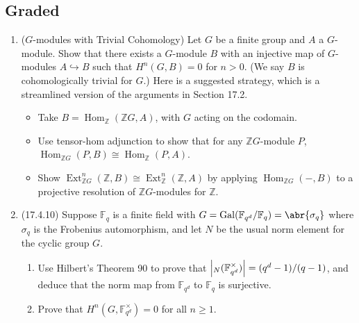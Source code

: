 \documentclass[11pt]{article}
\DeclareMathOperator{\Gal}{Gal}
\DeclareMathOperator{\Hom}{Hom}
\DeclareMathOperator{\Ext}{Ext}
\begin{document}
\subsection*{Graded}
\begin{enumerate}
    \item ($G$-modules with Trivial Cohomology) Let $G$ be a finite group and $A$ a $G$-module. Show that there exists a $G$-module $B$ with an injective map of $G$-modules $A\hookrightarrow B$ such that $H^n(G,B) = 0$ for $n>0$. (We say $B$ is cohomologically trivial for $G$.) Here is a suggested strategy, which is a streamlined version of the arguments in Section 17.2. \begin{itemize}
        \item Take $B = \Hom_{\mathbb{Z}}(\mathbb{Z}G, A)$, with $G$ acting on the codomain.
        \item Use tensor-hom adjunction to show that for any $\mathbb{Z}G$-module $P$, $\Hom_{\mathbb{Z}G}(P,B)\cong \Hom_\mathbb{Z}(P,A)$.
        \item Show $\Ext_{\mathbb{Z}G}^n(\mathbb{Z},B)\cong \Ext_\mathbb{Z}^n(\mathbb{Z},A)$ by applying $\Hom_{\mathbb{Z}G}(-,B)$ to a projective resolution of $\mathbb{Z}G$-modules for $\mathbb{Z}$.
    \end{itemize}
    \item (17.4.10) Suppose $\mathbb{F}_q$ is a finite field with $G= \Gal(\mathbb{F}_{q^d}/\mathbb{F}_q) = \abr{\sigma_q}$ where $\sigma_q$ is the Frobenius automorphism, and let $N$ be the usual norm element for the cyclic group $G$. \begin{enumerate}
        \item Use Hilbert's Theorem 90 to prove that $\abs{{}_N(\mathbb{F}_{q^d}^\times)} = (q^d-1)/(q-1)$, and deduce that the norm map from $\mathbb{F}_{q^d}$ to $\mathbb{F}_q$ is surjective.
        \item Prove that $H^n(G,\mathbb{F}_{q^d}^\times) = 0$ for all $n\geq 1$.
    \end{enumerate}
\end{enumerate}
\end{document}
